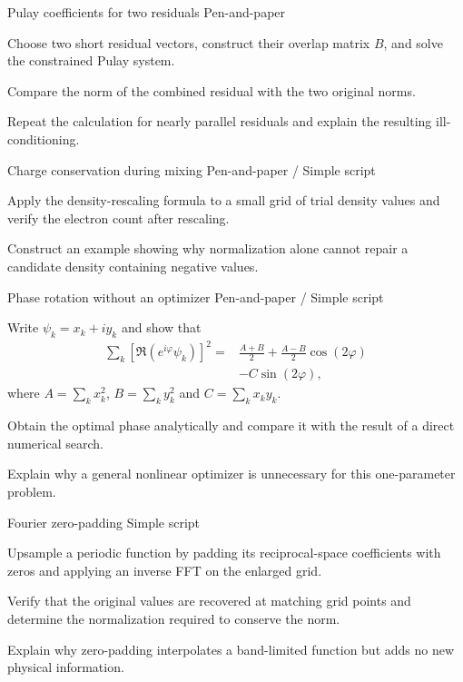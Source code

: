 \begin{exci}{Pulay coefficients for two residuals \hfill\textnormal{\small Pen-and-paper}}
    \item Choose two short residual vectors, construct their overlap matrix
    $B$, and solve the constrained Pulay system.
    \item Compare the norm of the combined residual with the two original
    norms.
    \item Repeat the calculation for nearly parallel residuals and explain the
    resulting ill-conditioning.
\end{exci}

\begin{exci}{Charge conservation during mixing \hfill\textnormal{\small Pen-and-paper / Simple script}}
    \item Apply the density-rescaling formula to a small grid of trial density
    values and verify the electron count after rescaling.
    \item Construct an example showing why normalization alone cannot repair a
    candidate density containing negative values.
\end{exci}

\begin{exci}{Phase rotation without an optimizer \hfill\textnormal{\small Pen-and-paper / Simple script}}
    \item Write $\psi_k=x_k+iy_k$ and show that
    \begin{align*}
        \sum_k\left[\mathfrak{R}\left(e^{i\varphi}\psi_k\right)\right]^2
        ={}&\frac{A+B}{2}+\frac{A-B}{2}\cos(2\varphi)\\
        &-C\sin(2\varphi),
    \end{align*}
    where $A=\sum_kx_k^2$, $B=\sum_ky_k^2$ and $C=\sum_kx_ky_k$.
    \item Obtain the optimal phase analytically and compare it with the result
    of a direct numerical search.
    \item Explain why a general nonlinear optimizer is unnecessary for this
    one-parameter problem.
\end{exci}

\begin{exci}{Fourier zero-padding \hfill\textnormal{\small Simple script}}
    \item Upsample a periodic function by padding its reciprocal-space
    coefficients with zeros and applying an inverse FFT on the enlarged grid.
    \item Verify that the original values are recovered at matching grid
    points and determine the normalization required to conserve the norm.
    \item Explain why zero-padding interpolates a band-limited function but
    adds no new physical information.
\end{exci}
